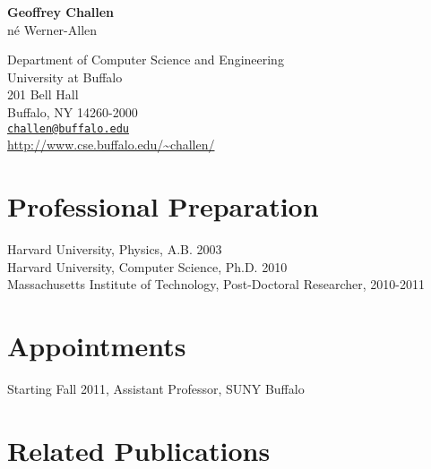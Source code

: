 \documentclass[11pt,letterpaper]{article}
\begin{document}
\begin{center}
{\huge \textbf{Geoffrey Challen}}\\
{\Large n\'{e} Werner-Allen}
\end{center}
Department of Computer Science and Engineering\\
University at Buffalo\\
201 Bell Hall\\
Buffalo, NY 14260-2000\\
\href{mailto:challen@buffalo.edu}{\texttt{challen@buffalo.edu}}\\
\url{http://www.cse.buffalo.edu/~challen/}

\section*{Professional Preparation}
Harvard University, Physics, A.B. 2003\\
Harvard University, Computer Science, Ph.D. 2010\\
Massachusetts Institute of Technology, Post-Doctoral Researcher, 2010-2011

\section*{Appointments}
Starting Fall 2011, Assistant Professor, SUNY Buffalo

\section*{Related Publications}
\end{document}
